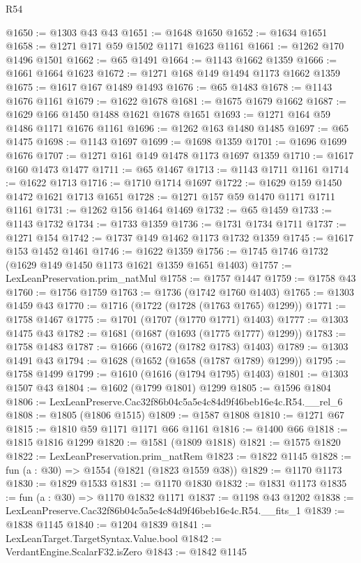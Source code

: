 \begin{lexlean}{R54}
\begin{coremodule}
@1650 := @1303 @43 @43
@1651 := @1648 @1650
@1652 := @1634 @1651
@1658 := @1271 @171 @59 @1502 @1171 @1623 @1161
@1661 := @1262 @170 @1496 @1501
@1662 := @65 @1491
@1664 := @1143 @1662 @1359
@1666 := @1661 @1664 @1623
@1672 := @1271 @168 @149 @1494 @1173 @1662 @1359
@1675 := @1617 @167 @1489 @1493
@1676 := @65 @1483
@1678 := @1143 @1676 @1161
@1679 := @1622 @1678
@1681 := @1675 @1679 @1662
@1687 := @1629 @166 @1450 @1488 @1621 @1678 @1651
@1693 := @1271 @164 @59 @1486 @1171 @1676 @1161
@1696 := @1262 @163 @1480 @1485
@1697 := @65 @1475
@1698 := @1143 @1697
@1699 := @1698 @1359
@1701 := @1696 @1699 @1676
@1707 := @1271 @161 @149 @1478 @1173 @1697 @1359
@1710 := @1617 @160 @1473 @1477
@1711 := @65 @1467
@1713 := @1143 @1711 @1161
@1714 := @1622 @1713
@1716 := @1710 @1714 @1697
@1722 := @1629 @159 @1450 @1472 @1621 @1713 @1651
@1728 := @1271 @157 @59 @1470 @1171 @1711 @1161
@1731 := @1262 @156 @1464 @1469
@1732 := @65 @1459
@1733 := @1143 @1732
@1734 := @1733 @1359
@1736 := @1731 @1734 @1711
@1737 := @1271 @154
@1742 := @1737 @149 @1462 @1173 @1732 @1359
@1745 := @1617 @153 @1452 @1461
@1746 := @1622 @1359
@1756 := @1745 @1746 @1732 (@1629 @149 @1450 @1173 @1621 @1359 @1651 @1403)
@1757 := LexLeanPreservation.prim_natMul
@1758 := @1757 @1447
@1759 := @1758 @43
@1760 := @1756 @1759
@1763 := @1736 (@1742 @1760 @1403)
@1765 := @1303 @1459 @43
@1770 := @1716 (@1722 (@1728 (@1763 @1765) @1299))
@1771 := @1758 @1467
@1775 := @1701 (@1707 (@1770 @1771) @1403)
@1777 := @1303 @1475 @43
@1782 := @1681 (@1687 (@1693 (@1775 @1777) @1299))
@1783 := @1758 @1483
@1787 := @1666 (@1672 (@1782 @1783) @1403)
@1789 := @1303 @1491 @43
@1794 := @1628 (@1652 (@1658 (@1787 @1789) @1299))
@1795 := @1758 @1499
@1799 := @1610 (@1616 (@1794 @1795) @1403)
@1801 := @1303 @1507 @43
@1804 := @1602 (@1799 @1801) @1299
@1805 := @1596 @1804
@1806 := LexLeanPreserve.Cac32f86b04c5a5e4c84d9f46beb16e4c.R54.__rel_6
@1808 := @1805 (@1806 @1515)
@1809 := @1587 @1808
@1810 := @1271 @67
@1815 := @1810 @59 @1171 @1171 @66 @1161
@1816 := @1400 @66
@1818 := @1815 @1816 @1299
@1820 := @1581 (@1809 @1818)
@1821 := @1575 @1820
@1822 := LexLeanPreservation.prim_natRem
@1823 := @1822 @1145
@1828 := fun (a : @30) => @1554 (@1821 (@1823 @1559 @38))
@1829 := @1170 @1173
@1830 := @1829 @1533
@1831 := @1170 @1830
@1832 := @1831 @1173
@1835 := fun (a : @30) => @1170 @1832 @1171
@1837 := @1198 @43 @1202
@1838 := LexLeanPreserve.Cac32f86b04c5a5e4c84d9f46beb16e4c.R54.__fits_1
@1839 := @1838 @1145
@1840 := @1204 @1839
@1841 := LexLeanTarget.TargetSyntax.Value.bool
@1842 := VerdantEngine.ScalarF32.isZero
@1843 := @1842 @1145

\end{coremodule}
\end{lexlean}

